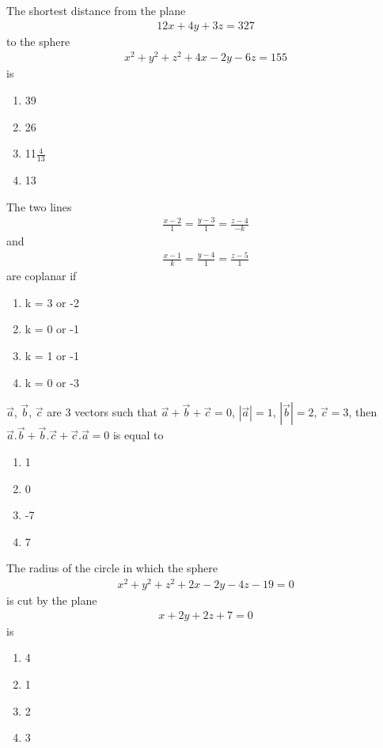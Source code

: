 \item The shortest distance from the plane 
\begin{align}
12x+4y+3z=327
\end{align}
to the sphere
\begin{align}
x^{2}+y^{2}+z^{2}+4x-2y-6z=155
\end{align}
is
\begin{enumerate}
\item 39
\item 26
\item 11$\frac{4}{13}$
\item 13
\end{enumerate}

\item The two lines 
\begin{align*}
\frac{x-2}{1} = \frac{y-3}{1} = \frac{z-4}{-k}
\end{align*}
and 
\begin{align*}
\frac{x-1}{k} = \frac{y-4}{1} = \frac{z-5}{1}
\end{align*}
are coplanar if
\begin{enumerate}
\item k = 3 or -2
\item k = 0 or -1
\item k = 1 or -1
\item k = 0 or -3
\end{enumerate}

\item $\overrightarrow{a}$, $\overrightarrow{b}$, $\overrightarrow{c}$ are 3 vectors such that 
$\overrightarrow{a}+\overrightarrow{b}+\overrightarrow{c}=0$, $|\overrightarrow{a}|=1$, $|\overrightarrow{b}|=2$, $\overrightarrow{c}=3$, then $\overrightarrow{a}.\overrightarrow{b}+\overrightarrow{b}.\overrightarrow{c}+\overrightarrow{c}.\overrightarrow{a}=0$ is equal to
\begin{enumerate}
\item 1
\item 0
\item -7
\item 7
\end{enumerate}

\item The radius of the circle in which the sphere
\begin{align}
x^2+y^2+z^2+2x-2y-4z-19=0 
\end{align}
is cut by the plane
\begin{align}
x+2y+2z+7=0
\end{align}
is
\begin{enumerate}
\item 4
\item 1
\item 2
\item 3
\end{enumerate}

